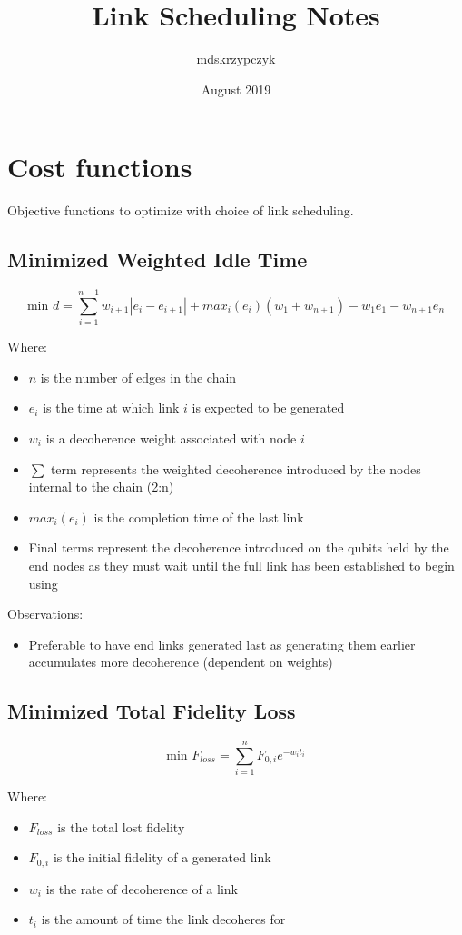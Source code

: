 \documentclass{article}
\title{Link Scheduling Notes}
\author{mdskrzypczyk }
\date{August 2019}
\begin{document}
\maketitle

\section{Cost functions}
Objective functions to optimize with choice of link scheduling.

\subsection{Minimized Weighted Idle Time}

    $$\text{min } d = \sum_{i=1}^{n-1} w_{i+1}|e_i - e_{i+1}| + max_i(e_i)(w_1 + w_{n+1}) - w_1e_1 - w_{n+1}e_n$$

Where:
\begin{itemize}
    \item $n$ is the number of edges in the chain
    \item $e_i$ is the time at which link $i$ is expected to be generated
    \item $w_i$ is a decoherence weight associated with node $i$
    \item $\sum$ term represents the weighted decoherence introduced by the nodes internal to the chain (2:n)
    \item $max_i(e_i)$ is the completion time of the last link
    \item Final terms represent the decoherence introduced on the qubits held by the end nodes as they must wait until the full link has been established to begin using
\end{itemize}

Observations:
\begin{itemize}
    \item Preferable to have end links generated last as generating them earlier accumulates more decoherence (dependent on weights)
\end{itemize}

\subsection{Minimized Total Fidelity Loss}

$$\text{min } F_{loss} = \sum_{i=1}^{n} F_{0,i}e^{-w_it_i}$$

Where:
\begin{itemize}
    \item $F_{loss}$ is the total lost fidelity
    \item $F_{0,i}$ is the initial fidelity of a generated link
    \item $w_i$ is the rate of decoherence of a link
    \item $t_i$ is the amount of time the link decoheres for
\end{itemize}
\end{document}
